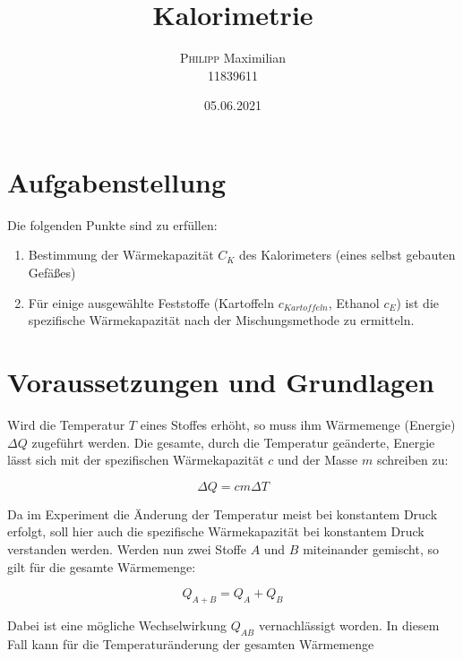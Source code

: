 \documentclass[11pt, ngerman]{scrartcl}
\begin{document}
\title{Kalorimetrie}
\author{\textsc{Philipp} Maximilian\\11839611}
\date{05.06.2021}
\maketitle

\tableofcontents
\newpage
\section{Aufgabenstellung}
\label{sec:aufgabenstellung}

Die folgenden Punkte sind zu erfüllen:

\begin{enumerate}
	\item Bestimmung der Wärmekapazität $C_K$ des Kalorimeters (eines selbst gebauten Gefäßes)
	\item Für einige ausgewählte Feststoffe (Kartoffeln $c_{Kartoffeln}$, Ethanol $c_{E}$)
	      ist die spezifische Wärmekapazität nach der Mischungsmethode zu ermitteln.
\end{enumerate}

\section{Voraussetzungen und Grundlagen}
\label{sec:voraussetzungen_grundlagen}

Wird die Temperatur $T$ eines Stoffes erhöht, so muss ihm Wärmemenge (Energie) $\Delta Q$
zugeführt werden. Die gesamte, durch die Temperatur geänderte, Energie lässt sich mit der
spezifischen Wärmekapazität $c$ und der Masse $m$ schreiben zu:

\begin{equation}
	\Delta Q = cm \Delta T
\end{equation}

Da im Experiment die Änderung der Temperatur meist bei konstantem Druck erfolgt, soll hier auch die spezifische Wärmekapazität bei konstantem Druck verstanden werden. Werden nun
zwei Stoffe $A$ und $B$ miteinander gemischt, so gilt für die gesamte Wärmemenge:

\begin{equation}
	Q_{A+B} = Q_A + Q_{B}
\end{equation}

Dabei ist eine mögliche Wechselwirkung $Q_{AB}$ vernachlässigt worden. In diesem Fall kann für
die Temperaturänderung der gesamten Wärmemenge
\end{document}

